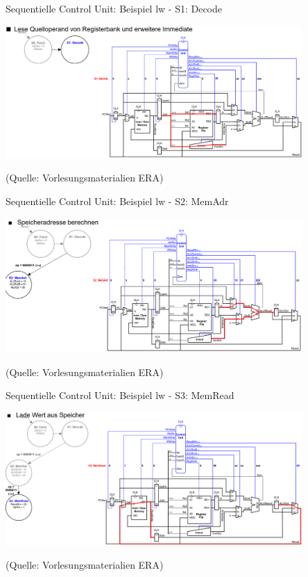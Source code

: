 \documentclass[
  german,            %
  aspectratio=169,    %
]{tumbeamer}
\begin{document}
\begin{frame}[c]{Sequentielle Control Unit: Beispiel lw - S1: Decode}{}
	\begin{center}
		\includegraphics[width=0.85\textwidth]{w09_lw2_lv.png}
	\end{center}
	\centering
	\tiny (Quelle: Vorlesungsmaterialien ERA)
\end{frame}

\begin{frame}[c]{Sequentielle Control Unit: Beispiel lw - S2: MemAdr}{}
	\begin{center}
		\includegraphics[width=0.85\textwidth]{w09_lw3_lv.png}
	\end{center}
	\centering
	\tiny (Quelle: Vorlesungsmaterialien ERA)
\end{frame}

\begin{frame}[c]{Sequentielle Control Unit: Beispiel lw - S3: MemRead}{}
	\begin{center}
		\includegraphics[width=0.85\textwidth]{w09_lw4_lv.png}
	\end{center}
	\centering
	\tiny (Quelle: Vorlesungsmaterialien ERA)
\end{frame}
\end{document}
